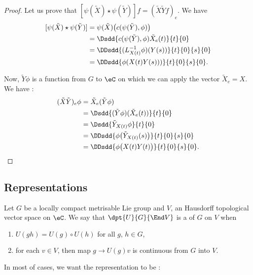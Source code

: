 \begin{proof}
Let us prove that $[\psi(\tilde X)\star\psi(\tilde Y)]f=(\tilde X\tilde Yf)_e$. We have
\begin{equation}
\begin{split}
   [\psi(\tilde X)\star\psi(\tilde Y)]&=\psi(\tilde X)\big( c(\psi(\tilde Y),\phi) \big)\\
		&=\Dsdd{ c(\psi(\tilde Y),\phi)\tilde X_e(t) }{t}{0}\\
		&=\DDsdd{ (L^{-1}_{X(t)}\phi)(Y(s)) }{t}{0}{s}{0}\\
		&=\DDsdd{ \phi(X(t)Y(s))) }{t}{0}{s}{0}.
\end{split}
\end{equation}

Now, $\tilde Y\phi$ is a function from $G$ to $\eC$ on which we can apply the vector $\tilde X_e=X$. We have :
\begin{equation}
\begin{split}
(\tilde X\tilde Y)_e\phi&=\tilde X_e(\tilde Y\phi)\\
		&=\Dsdd{ (\tilde Y\phi)(\tilde X_e(t)) }{t}{0}\\
		&=\Dsdd{ \tilde Y_{X(t)}\phi }{t}{0}\\
		&=\DDsdd{ \phi\big( \tilde Y_{X(t)}(s) \big) }{t}{0}{s}{0}\\
		&=\DDsdd{ \phi\big( X(t)Y(t) \big) }{t}{0}{s}{0}.
\end{split}
\end{equation}

\end{proof}

\subsection{Representations}

Let $G$ be a locally compact metrisable Lie group and $V$, an Hausdorff topological vector space on $\eC$. We say that $\dpt{U}{G}{\End V}$ is a  of $G$ on $V$ when

\begin{enumerate}
\item $U(gh)=U(g)\circ U(h)$ for all $g$, $h\in G$,
\item for each $v\in V$, then map $g\to U(g)v$ is continuous from $G$ into $V$.
\setcounter{bidon}{\value{enumi}}
\end{enumerate}
In most of cases, we want the representation to be  :


